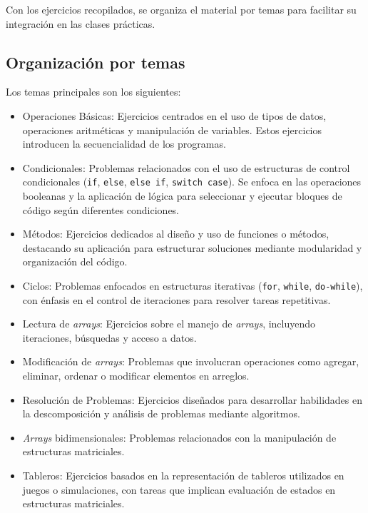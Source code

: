 \documentclass{article}
\begin{document}
Con los ejercicios recopilados, se organiza el material por temas para facilitar su integración en las clases prácticas.

\subsection{Organización por temas}  
Los temas principales son los siguientes: 

\begin{itemize}  
    \item Operaciones Básicas:  
    Ejercicios centrados en el uso de tipos de datos, operaciones aritméticas y manipulación de variables. Estos ejercicios introducen la secuencialidad de los programas.  

    \item Condicionales:  
    Problemas relacionados con el uso de estructuras de control condicionales (\texttt{if}, \texttt{else}, \texttt{else if}, \texttt{switch case}). Se enfoca en las operaciones booleanas y la aplicación de lógica para seleccionar y ejecutar bloques de código según diferentes condiciones.

    \item Métodos:
    Ejercicios dedicados al diseño y uso de funciones o métodos, destacando su aplicación para estructurar soluciones mediante modularidad y organización del código.  

    \item Ciclos:  
    Problemas enfocados en estructuras iterativas (\texttt{for}, \texttt{while}, \texttt{do-while}), con énfasis en el control de iteraciones para resolver tareas repetitivas.

    \item Lectura de \textit{arrays}:  
    Ejercicios sobre el manejo de \textit{arrays}, incluyendo iteraciones, búsquedas y acceso a datos.  

    \item Modificación de \textit{arrays}:  
    Problemas que involucran operaciones como agregar, eliminar, ordenar o modificar elementos en arreglos.  

    \item Resolución de Problemas:  
    Ejercicios diseñados para desarrollar habilidades en la descomposición y análisis de problemas mediante algoritmos.

    \item \textit{Arrays} bidimensionales:  
    Problemas relacionados con la manipulación de estructuras matriciales.  

    \item Tableros:  
    Ejercicios basados en la representación de tableros utilizados en juegos o simulaciones, con tareas que implican evaluación de estados en estructuras matriciales.
\end{itemize}  
\end{document}
